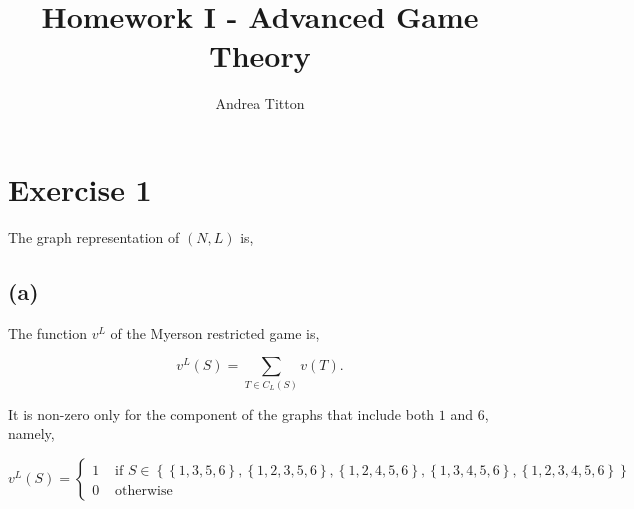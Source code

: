 \documentclass[american]{scrartcl}
\title{Homework I - Advanced Game Theory }
\author{Andrea Titton}
\newcommand{\set}[1]{\left\{#1\right\}}
\begin{document}

\maketitle

\section*{Exercise 1}

The graph representation of $(N, L)$ is,

\vspace{1cm}
\begin{center}
\end{center}

\subsection*{(a)}

The function $v^L$ of the Myerson restricted game is,

\begin{equation}
    v^L(S) = \sum_{T \in C_L(S)} v(T).
\end{equation}

It is non-zero only for the component of the graphs that include both $1$ and $6$, namely,

\begin{equation} \label{value_a}
    v^L(S) = \begin{cases}
        1 & \text{ if } S \in \set{\set{1, 3, 5, 6}, \set{1, 2, 3, 5, 6}, \set{1, 2, 4, 5, 6}, \set{1, 3, 4, 5, 6}, \set{1, 2, 3, 4, 5, 6}} \\
        0 & \text{ otherwise }
    \end{cases}
\end{equation}
\end{document}
